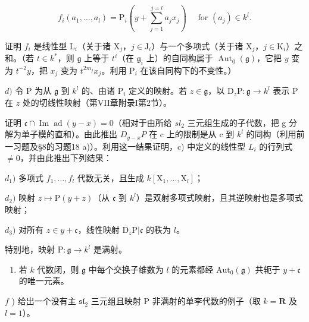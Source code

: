 \[
f _ {i} \left(a _ {1}, \dots , a _ {l}\right) = \mathrm{P} _ {i} \left(y + \sum_ {j = 1} ^ {j = l} a _ {j} x _ {j}\right) \quad \text { for } \left(a _ {j}\right) \in k ^ {l}.
\]

证明 \(f_{i}\) 是线性型 \(\mathrm{L}_i\)（关于诸 \(\mathrm{X}_j\)，\(j \in \mathrm{J}_i\)）与一个多项式（关于诸 \(\mathrm{X}_j\)，\(j \in \mathrm{K}_i\)）之和。（若 \(t \in k^*\)，则 \(\mathfrak{g}\) 上等于 \(t^i\)（在 \(\mathfrak{g}_i\) 上）的自同构属于 \(\operatorname{Aut}_0(\mathfrak{g})\)，它把 \(y\) 变为 \(t^{-2}y\)，把 \(x_j\) 变为 \(t^{2m_j}x_j\)。利用 \(\mathrm{P}_i\) 在该自同构下的不变性。）

\(d)\) 令 \(\mathrm{P}\) 为从 \(\mathfrak{g}\) 到 \(k^l\) 的、由诸 \(\mathrm{P}_i\) 定义的映射。若 \(z \in \mathfrak{g}\)，以 \(\mathrm{D}_z\mathrm{P} : \mathfrak{g} \to k^l\) 表示 \(\mathrm{P}\) 在 \(z\) 处的切线性映射（第VII章附录I第2节）。

证明 \(\mathfrak{c}\cap\operatorname{Im}\operatorname{ad}(y-x)=0\)（相对于由所给 \(sl_{2}\) 三元组生成的子代数，把 g 分解为单子模的直和）。由此推出 \(D_{y-x}P\) 在 c 上的限制是从 c 到 \(k^{l}\) 的同构（利用前一习题及§8的习题18 a)）。利用这一结果证明，c) 中定义的线性型 \(L_{i}\) 的行列式 \(\neq0\)，并由此推出下列结果：

\(d_{1})\) 多项式 \(f_{1},\ldots ,f_{l}\) 代数无关，且生成 \(k[\mathrm{X}_1,\dots ,\mathrm{X}_l]\)；

\(d_{2})\) 映射 \(z \mapsto \mathrm{P}(y + z)\)（从 \(\mathfrak{c}\) 到 \(k^{l}\)）是双射多项式映射，且其逆映射也是多项式映射；

\(d_{3})\) 对所有 \(z\in y + \mathfrak{c}\)，线性映射 \(\mathrm{D}_z\mathrm{P}|\mathfrak{c}\) 的秩为 \(l\)。

特别地，映射 \(\mathrm{P}:\mathfrak{g}\to k^l\) 是满射。

\begin{enumerate}
\def\labelenumi{\alph{enumi})}
\setcounter{enumi}{4}
\tightlist
\item
  若 \(k\) 代数闭，则 \(\mathfrak{g}\) 中每个交换子维数为 \(l\) 的元素都经 \(\mathrm{Aut}_0(\mathfrak{g})\) 共轭于 \(y + \mathfrak{c}\) 的唯一元素。
\end{enumerate}

\(f\) ) 给出一个没有主 \(\mathfrak{sl}_2\) 三元组且映射 \(\mathrm{P}\) 非满射的单李代数的例子（取 \(k = \mathbf{R}\) 及 \(l = 1\)）。

